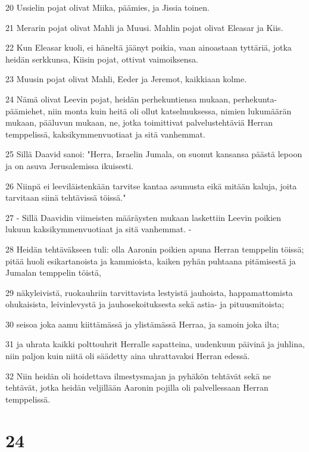 \par 20 Ussielin pojat olivat Miika, päämies, ja Jissia toinen.
\par 21 Merarin pojat olivat Mahli ja Muusi. Mahlin pojat olivat Eleasar ja Kiis.
\par 22 Kun Eleasar kuoli, ei häneltä jäänyt poikia, vaan ainoastaan tyttäriä, jotka heidän serkkunsa, Kiisin pojat, ottivat vaimoiksensa.
\par 23 Muusin pojat olivat Mahli, Eeder ja Jeremot, kaikkiaan kolme.
\par 24 Nämä olivat Leevin pojat, heidän perhekuntiensa mukaan, perhekunta-päämiehet, niin monta kuin heitä oli ollut katselmuksessa, nimien lukumäärän mukaan, pääluvun mukaan, ne, jotka toimittivat palvelustehtäviä Herran temppelissä, kaksikymmenvuotiaat ja sitä vanhemmat.
\par 25 Sillä Daavid sanoi: "Herra, Israelin Jumala, on suonut kansansa päästä lepoon ja on asuva Jerusalemissa ikuisesti.
\par 26 Niinpä ei leeviläistenkään tarvitse kantaa asumusta eikä mitään kaluja, joita tarvitaan siinä tehtävissä töissä."
\par 27 - Sillä Daavidin viimeisten määräysten mukaan laskettiin Leevin poikien lukuun kaksikymmenvuotiaat ja sitä vanhemmat. -
\par 28 Heidän tehtäväkseen tuli: olla Aaronin poikien apuna Herran temppelin töissä; pitää huoli esikartanoista ja kammioista, kaiken pyhän puhtaana pitämisestä ja Jumalan temppelin töistä,
\par 29 näkyleivistä, ruokauhriin tarvittavista lestyistä jauhoista, happamattomista ohukaisista, leivinlevystä ja jauhosekoituksesta sekä astia- ja pituusmitoista;
\par 30 seisoa joka aamu kiittämässä ja ylistämässä Herraa, ja samoin joka ilta;
\par 31 ja uhrata kaikki polttouhrit Herralle sapatteina, uudenkuun päivinä ja juhlina, niin paljon kuin niitä oli säädetty aina uhrattavaksi Herran edessä.
\par 32 Niin heidän oli hoidettava ilmestysmajan ja pyhäkön tehtävät sekä ne tehtävät, jotka heidän veljillään Aaronin pojilla oli palvellessaan Herran temppelissä.

\chapter{24}


